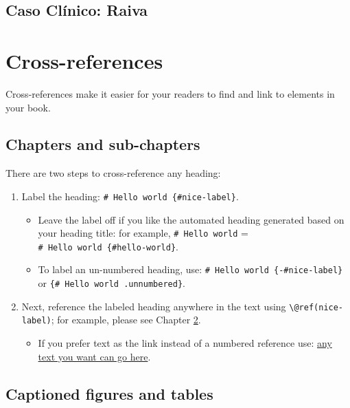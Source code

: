 \documentclass[
]{book}
\providecommand{\tightlist}{%
  \setlength{\itemsep}{0pt}\setlength{\parskip}{0pt}}
\theoremstyle{definition}
\theoremstyle{definition}
\theoremstyle{definition}
\theoremstyle{definition}
\theoremstyle{remark}
\begin{document}
\hypertarget{caso-cluxednico-raiva}{%
\section{Caso Clínico: Raiva}\label{caso-cluxednico-raiva}}

\hypertarget{cross}{%
\chapter{Cross-references}\label{cross}}

Cross-references make it easier for your readers to find and link to elements in your book.

\hypertarget{chapters-and-sub-chapters}{%
\section{Chapters and sub-chapters}\label{chapters-and-sub-chapters}}

There are two steps to cross-reference any heading:

\begin{enumerate}
\def\labelenumi{\arabic{enumi}.}
\tightlist
\item
  Label the heading: \texttt{\#\ Hello\ world\ \{\#nice-label\}}.

  \begin{itemize}
  \tightlist
  \item
    Leave the label off if you like the automated heading generated based on your heading title: for example, \texttt{\#\ Hello\ world} = \texttt{\#\ Hello\ world\ \{\#hello-world\}}.
  \item
    To label an un-numbered heading, use: \texttt{\#\ Hello\ world\ \{-\#nice-label\}} or \texttt{\{\#\ Hello\ world\ .unnumbered\}}.
  \end{itemize}
\item
  Next, reference the labeled heading anywhere in the text using \texttt{\textbackslash{}@ref(nice-label)}; for example, please see Chapter \ref{cross}.

  \begin{itemize}
  \tightlist
  \item
    If you prefer text as the link instead of a numbered reference use: \protect\hyperlink{cross}{any text you want can go here}.
  \end{itemize}
\end{enumerate}

\hypertarget{captioned-figures-and-tables}{%
\section{Captioned figures and tables}\label{captioned-figures-and-tables}}
\end{document}
